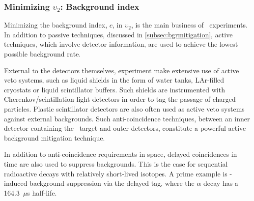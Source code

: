 

\subsubsection{Minimizing $\upsilon_2$: Background index} %

Minimizing the background index, $c$, in $\upsilon_2$, is the main business of 
\bbonu\ experiments. In addition to passive techniques, discussed in 
\ref{subsec:bgrmitigation}, active techniques, which involve detector information, are used to achieve the lowest possible background rate.


External to the detectors themselves, experiment make extensive use of {active} veto systems, such as 
liquid shields in the form of water tanks, LAr-filled cryostats or liquid scintillator buffers. Such shields are instrumented with Cherenkov/scintillation light detectors in order to tag the passage of charged particles. Plastic scintillator detectors are also often used as active veto systems against external backgrounds. Such anti-coincidence techniques, between an inner detector containing the \bbonu\ target and outer detectors, constitute a powerful active background mitigation technique. 


In addition to anti-coincidence requirements in space, delayed coincidences in time are also used to suppress backgrounds. This is the case for sequential radioactive decays with relatively short-lived isotopes. A prime example is -induced background suppression via the delayed  tag, where the  $\alpha$ decay has a 164.3~$\mu$s half-life. 

